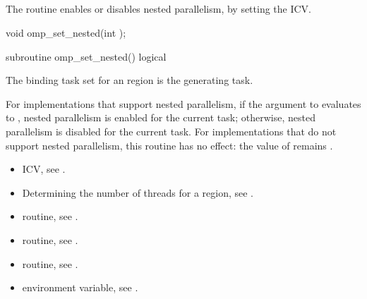 \subsection{}
\label{subsec:omp_set_nested}
\summary
The  routine enables or disables nested parallelism, by setting the 
 ICV. 

\format
\ccppspecificstart
\begin{boxedcode}
void omp\_set\_nested(int );
\end{boxedcode}
\ccppspecificend

\fortranspecificstart
\begin{boxedcode}
subroutine omp\_set\_nested()
logical 
\end{boxedcode}
\fortranspecificend

\binding
The binding task set for an  region is the generating task. 

\effect
For implementations that support nested parallelism, if the argument to 
 evaluates to , nested parallelism is enabled for the current task; 
otherwise, nested parallelism is disabled for the current task. For implementations that 
do not support nested parallelism, this routine has no effect: the value of  
remains .

\crossreferences
\begin{itemize}
\item {} ICV, see 
.

\item Determining the number of threads for a  region, see
. 

\item {} routine, see 
.

\item {} routine, see 
.

\item {} routine, see 
.

\item {} environment variable, see 
.
\end{itemize}








